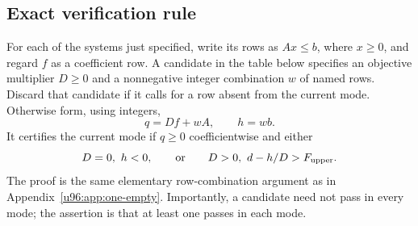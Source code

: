 \documentclass[11pt,a4paper]{article}
\theoremstyle{remark}
\begin{document}
\subsection{Exact verification rule}
For each of the systems just specified, write its rows as $Ax\leq b$,
where $x\geq0$, and regard $f$ as a coefficient row. A candidate in the
table below specifies an objective multiplier $D\geq0$ and a nonnegative
integer combination $w$ of named rows. Discard that candidate if it calls
for a row absent from the current mode. Otherwise form, using integers,
\[
 q=Df+wA,\qquad h=wb.
\]
It certifies the current mode if $q\geq0$ coefficientwise and either
\[
 D=0,\ h<0,
 \qquad\hbox{or}\qquad
 D>0,\ d-h/D>F_{\rm upper}.
\]
The proof is the same elementary row-combination argument as in
Appendix~\ref{u96:app:one-empty}. Importantly, a candidate need not pass in
every mode; the assertion is that at least one passes in each mode.
\end{document}
